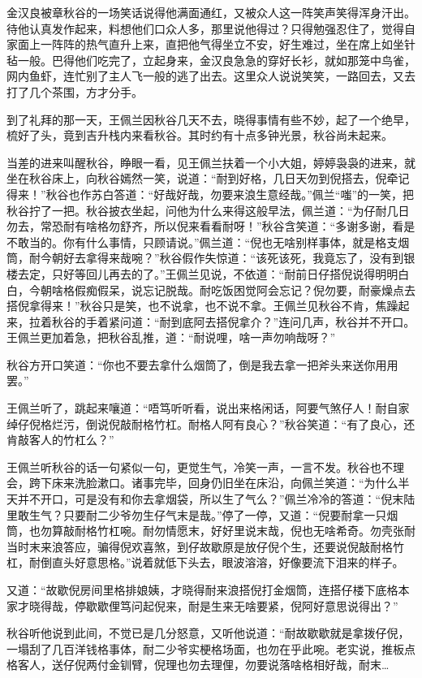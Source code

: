 \documentclass[12pt,UTF8]{ctexbook}
\begin{document}
{{{金汉良被章秋谷的一场笑话说得他满面通红，又被众人这一阵笑声笑得浑身汗出。待他认真发作起来，料想他们口众人多，那里说他得过？只得勉强忍住了，觉得自家面上一阵阵的热气直升上来，直把他气得坐立不安，好生难过，坐在席上如坐针毡一般。巴得他们吃完了，立起身来，金汉良急急的穿好长衫，就如那笼中鸟雀，网内鱼虾，连忙别了主人飞一般的逃了出去。这里众人说说笑笑，一路回去，又去打了几个茶围，方才分手。

到了礼拜的那一天，王佩兰因秋谷几天不去，晓得事情有些不妙，起了一个绝早，梳好了头，竟到吉升栈内来看秋谷。其时约有十点多钟光景，秋谷尚未起来。

当差的进来叫醒秋谷，睁眼一看，见王佩兰扶着一个小大姐，婷婷袅袅的进来，就坐在秋谷床上，向秋谷嫣然一笑，说道：“耐到好格，几日天勿到倪搭去，倪牵记得来！”秋谷也作苏白答道：“好哉好哉，勿要来浪生意经哉。”佩兰“嗤”的一笑，把秋谷拧了一把。秋谷披衣坐起，问他为什么来得这般早法，佩兰道：“为仔耐几日勿去，常恐耐有啥格勿舒齐，所以倪来看看耐呀！”秋谷含笑道：“多谢多谢，看是不敢当的。你有什么事情，只顾请说。”佩兰道：“倪也无啥别样事体，就是格支烟筒，耐今朝好去拿得来哉啘？”秋谷假作失惊道：“该死该死，我竟忘了，没有到银楼去定，只好等回儿再去的了。”王佩兰见说，不依道：“耐前日仔搭倪说得明明白白，今朝啥格假痴假呆，说忘记脱哉。耐吃饭困觉阿会忘记？倪勿要，耐豪燥点去搭倪拿得来！”秋谷只是笑，也不说拿，也不说不拿。王佩兰见秋谷不肯，焦躁起来，拉着秋谷的手着紧问道：“耐到底阿去搭倪拿介？”连问几声，秋谷并不开口。王佩兰更加着急，把秋谷乱推，道：“耐说哩，啥一声勿响哉呀？”

秋谷方开口笑道：“你也不要去拿什么烟筒了，倒是我去拿一把斧头来送你用用罢。”

王佩兰听了，跳起来嚷道：“唔笃听听看，说出来格闲话，阿要气煞仔人！耐自家绰仔倪格烂污，倒说倪敲耐格竹杠。耐格人阿有良心？”秋谷笑道：“有了良心，还肯敲客人的竹杠么？”

王佩兰听秋谷的话一句紧似一句，更觉生气，冷笑一声，一言不发。秋谷也不理会，跨下床来洗脸漱口。诸事完毕，回身仍旧坐在床沿，向佩兰笑道：“为什么半天并不开口，可是没有和你去拿烟袋，所以生了气么？”佩兰冷冷的答道：“倪末陆里敢生气？只要耐二少爷勿生仔气末是哉。”停了一停，又道：“倪要耐拿一只烟筒，也勿算敲耐格竹杠啘。耐勿情愿末，好好里说末哉，倪也无啥希奇。勿壳张耐当时末来浪答应，骗得倪欢喜煞，到仔故歇原是放仔倪个生，还要说倪敲耐格竹杠，耐倒直头好意思格。”说着就低下头去，眼波溶溶，好像要流下泪来的样子。

又道：“故歇倪房间里格排娘姨，才晓得耐来浪搭倪打金烟筒，连搭仔楼下底格本家才晓得哉，停歇歇俚笃问起倪来，耐是生来无啥要紧，倪阿好意思说得出？”

秋谷听他说到此间，不觉已是几分怒意，又听他说道：“耐故歇歇就是拿拨仔倪，一塌刮了几百洋钱格事体，耐二少爷实梗格场面，也勿在乎此啘。老实说，推板点格客人，送仔倪两付金钏臂，倪理也勿去理俚，勿要说落啥格相好哉，耐末…

}}}
\end{document}
